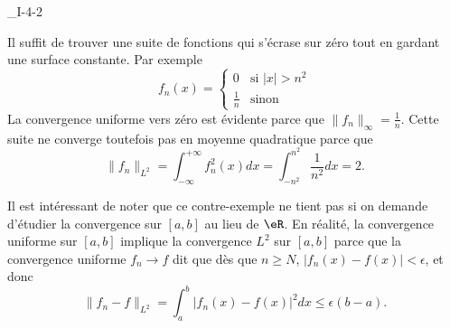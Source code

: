 

\begin{corrige}{_I-4-2}

Il suffit de trouver une suite de fonctions qui s'écrase sur zéro tout en gardant une surface constante. Par exemple
\begin{equation}
	f_n(x)=
\begin{cases}
	0	&	\text{si }| x |>n^2\\
	\frac{ 1 }{ n }	&	 \text{sinon}
\end{cases}
\end{equation}
La convergence uniforme vers zéro est évidente parce que $\| f_n \|_{\infty}=\frac{1}{ n }$. Cette suite ne converge toutefois pas en moyenne quadratique parce que
\begin{equation}
	\| f_n \|_{L^2}=\int_{-\infty}^{+\infty}f_n^2(x)dx=\int_{-n^2}^{n^2}\frac{1}{ n^2 }dx=2.
\end{equation}

Il est intéressant de noter que ce contre-exemple ne tient pas si on demande d'étudier la convergence sur $[a,b]$ au lieu de $\eR$. En réalité, la convergence uniforme sur $[a,b]$ implique la convergence $L^2$ sur $[a,b]$ parce que la convergence uniforme $f_n\to f$ dit que dès que $n\geq N$, $| f_n(x)-f(x) |<\epsilon$, et donc
\begin{equation}
	\| f_n-f \|_{L^2}=\int_a^b| f_n(x)-f(x) |^2dx\leq\epsilon(b-a).
\end{equation}

\end{corrige}
